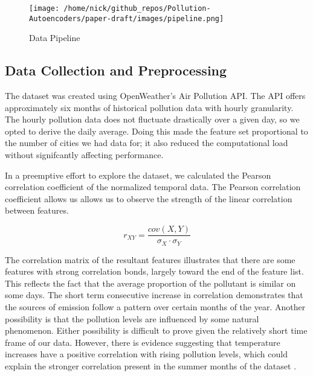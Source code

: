 \documentclass{article}
\begin{document}
\newpage

\begin{Center}
\begin{figure}[h!]
\caption{Data Pipeline}
\label{fig:pipeline}
    \begin{center}
    \texttt{[image: /home/nick/github\_repos/Pollution-Autoencoders/paper-draft/images/pipeline.png]}
    \end{center}
\end{figure}
\end{Center}

\subsection{Data Collection and Preprocessing}

\par The dataset was created using OpenWeather's Air Pollution API. The API offers approximately six months of historical pollution data with hourly granularity. The hourly pollution data does not fluctuate drastically over a given day, so we opted to derive the daily average. Doing this made the feature set proportional to the number of cities we had data for; it also reduced the computational load without signifcantly affecting performance. 

\par In a preemptive effort to explore the dataset, we calculated the Pearson correlation coefficient of the normalized temporal data. The Pearson correlation coefficient allows us allows us to observe the strength of the linear correlation between features. 

\begin{equation*}
    r_{XY}=\frac{cov(X,Y)}{\sigma_{X} \cdot \sigma_{Y}}
\end{equation*}

\par The correlation matrix of the resultant features illustrates that there are some features with strong correlation bonds, largely toward the end of the feature list. This reflects the fact that the average proportion of the pollutant is similar on some days. The short term consecutive increase in correlation demonstrates that the sources of emission follow a pattern over certain months of the year. Another possibility is that the pollution levels are influenced by some natural phenomenon. Either possibility is difficult to prove given the relatively short time frame of our data. However, there is evidence suggesting that temperature increases have a positive correlation with rising pollution levels, which could explain the stronger correlation present in the summer months of the dataset \parencite{jayamurugan2013}.
\end{document}
